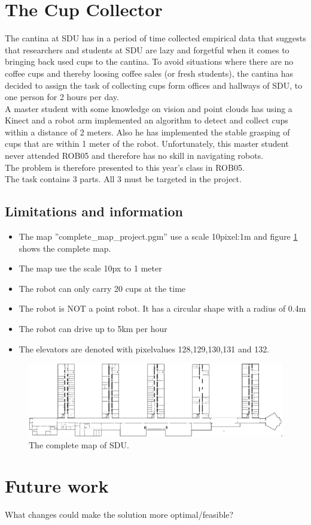 \documentclass[11pt,a4paper]{article}
\begin{document}
\section{The Cup Collector}
The cantina at SDU has in a period of time collected empirical data that suggests that researchers and students at SDU are lazy and forgetful when it comes to bringing back used cups to the cantina. To avoid situations where there are no coffee cups and thereby loosing coffee sales (or fresh students), the cantina has decided to assign the task of collecting cups form offices and hallways of SDU, to one person for 2 hours per day.\\[0.2cm]
A master student with some knowledge on vision and point clouds has using a Kinect and a robot arm implemented an algorithm to detect and collect cups within a distance of 2 meters. Also he has implemented the stable grasping of cups that are within 1 meter of the robot. Unfortunately, this master student never attended ROB05 and therefore has no skill in navigating robots.\\[0.2cm]
The problem is therefore presented to this year’s class in ROB05.\\[0.2cm]
The task contains 3 parts. All 3 must be targeted in the project.

\subsection{Limitations and information}
\begin{itemize}
\item The map ”complete\_map\_project.pgm” use a scale 10pixel:1m and figure \ref{fig::original} shows the complete map. 
\item The map use the scale 10px to 1 meter
\item The robot can only carry 20 cups at the time
\item The robot is NOT a point robot. It has a circular shape with a radius of 0.4m
\item The robot can drive up to 5km per hour
\item The elevators are denoted with pixelvalues 128,129,130,131 and 132.
\end{itemize}


\begin{figure}[H]
\centering
\includegraphics[scale=0.33]{img/original.png}
\caption{The complete map of SDU.}
\label{fig::original}
\end{figure}

\newpage


\newpage


\newpage


\newpage

\section{Future work}
What changes could make the solution more optimal/feasible?
\end{document}
